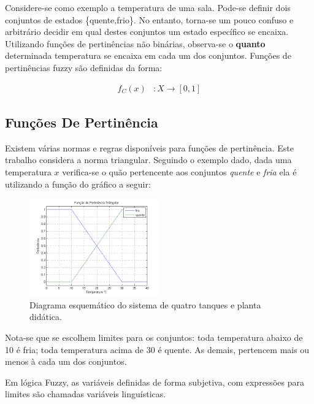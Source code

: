 Considere-se como exemplo a temperatura de uma sala. Pode-se definir dois conjuntos de estados \{quente,frio\}. No entanto, torna-se um pouco confuso e arbitrário decidir em qual destes conjuntos um estado específico se encaixa. Utilizando funções de pertinências não binárias, observa-se o \textbf{quanto} determinada temperatura se encaixa em cada um dos conjuntos. Funções de pertinências fuzzy são definidas da forma:

\begin{align*}
f_{C}(x)&:X \rightarrow [0,1]
\end{align*}

\subsection{Funções De Pertinência}
Existem várias normas e regras disponíveis para funções de pertinência. Este trabalho considera a norma triangular. Seguindo o exemplo dado, dada uma temperatura $x$ verifica-se o quão pertencente aos conjuntos \textit{quente} e \textit{fria} ela é utilizando a função do gráfico a seguir:

\begin{figure}[H]
	\includegraphics[width=0.5\textwidth]{img/pertinencia.png}
	\caption{Diagrama esquemático do sistema de quatro tanques e planta didática.}
	\label{figPertinencia}
\end{figure}

Nota-se que se escolhem limites para os conjuntos: toda temperatura abaixo de 10 é fria; toda temperatura acima de 30 é quente. As demais, pertencem mais ou menos à cada um dos conjuntos.

Em lógica Fuzzy, as variáveis definidas de forma subjetiva, com expressões para limites são chamadas variáveis linguísticas.




%


